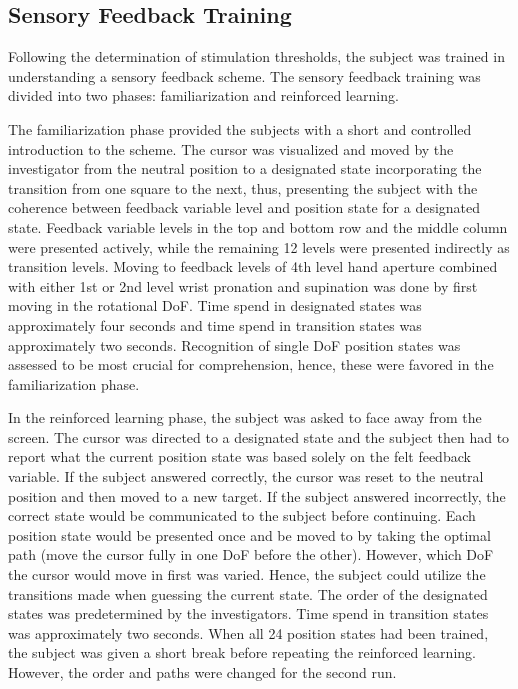 
\subsection{Sensory Feedback Training}

Following the determination of stimulation thresholds, the subject was trained in understanding a sensory feedback scheme. The sensory feedback training was divided into two phases: familiarization and reinforced learning. 

The familiarization phase provided the subjects with a short and controlled introduction to the scheme. The cursor was visualized and moved by the investigator from the neutral position to a designated state incorporating the transition from one square to the next, thus, presenting the subject with the coherence between feedback variable level and position state for a designated state. Feedback variable levels in the top and bottom row and the middle column were presented actively, while the remaining 12 levels were presented indirectly as transition levels. Moving to feedback levels of 4th level hand aperture combined with either 1st or 2nd level wrist pronation and supination was done by first moving in the rotational DoF. Time spend in designated states was approximately four seconds and time spend in transition states was approximately two seconds. Recognition of single DoF position states was assessed to be most crucial for comprehension, hence, these were favored in the familiarization phase. 

In the reinforced learning phase, the subject was asked to face away from the screen. The cursor was directed to a designated state and the subject then had to report what the current position state was based solely on the felt feedback variable. If the subject answered correctly, the cursor was reset to the neutral position and then moved to a new target. If the subject answered incorrectly, the correct state would be communicated to the subject before continuing. Each position state would be presented once and be moved to by taking the optimal path (move the cursor fully in one DoF before the other). However, which DoF the cursor would move in first was varied. Hence, the subject could utilize the transitions made when guessing the current state. The order of the designated states was predetermined by the investigators. Time spend in transition states was approximately two seconds. When all 24 position states had been trained, the subject was given a short break before repeating the reinforced learning. However, the order and paths were changed for the second run.